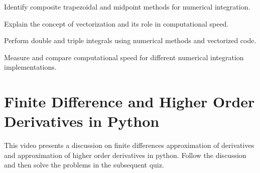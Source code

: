 \begin{mlos}
\item Identify composite trapezoidal and midpoint methods for numerical integration.
\item Explain the concept of vectorization and its role in computational speed.
\item Perform double and triple integrals using numerical methods and vectorized code.
\item Measure and compare computational speed for different numerical integration implementations. 
\end{mlos}

\section{Finite Difference and Higher Order Derivatives in Python}
\videolesson
\begin{selfvideo}[1]
This video presents a discussion on finite differences approximation of derivatives and approximation of higher order derivatives in python. Follow the discussion and then solve the problems in the subsequent quiz.
\end{selfvideo}
%
%
